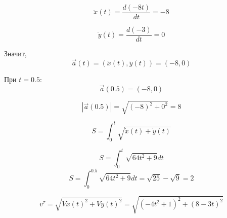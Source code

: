 \[
 {\ddot x}(t) = \frac{ d (-8t)}{ dt} = -8
 \]
 
 \[
    {\ddot y}(t) = \frac{ d (-3)}{ d t} =0
 \]

Значит,
\[
 \vec{a}(t) = \left( {\ddot x(t), {\ddot y(t)}}\right) = (-8, 0)
\]

При $t = 0.5$:
\[
\vec{a} (0.5) = (-8 ,0)
\]

\[
    \left| \vec{a}(0.5)\right| = \sqrt{(-8)^{ 2} + 0^2} = 8
\]


\[
S = \int_{ 0}^{ t} \sqrt{ {\dot x}(t) + {\dot y}(t) }
\]

\[
    S= \int_{ 0}^{t} \sqrt{64t^{ 2} +9}dt
\]
\[
    S= \int_{ 0}^{0.5} \sqrt{64t^{ 2} +9}dt = \sqrt{25} - \sqrt{9} = 2
\]

\[
 v^{ \tau} = \sqrt{Vx(t)^{ 2} + Vy(t)^{ 2}} = \sqrt{(-4t^{2} + 1)^{ 2} + (8 - 3t)^{ 2}}
\]







